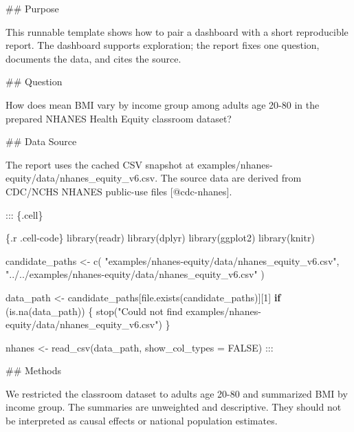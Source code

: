 \documentclass[
  letterpaper,
  DIV=11,
  numbers=noendperiod,
  oneside]{scrreprt}
\newenvironment{Shaded}{\begin{snugshade}}{\end{snugshade}}
\newcommand{\AttributeTok}[1]{\textcolor[rgb]{0.40,0.45,0.13}{#1}}
\newcommand{\CommentTok}[1]{\textcolor[rgb]{0.37,0.37,0.37}{#1}}
\newcommand{\ConstantTok}[1]{\textcolor[rgb]{0.56,0.35,0.01}{#1}}
\newcommand{\ControlFlowTok}[1]{\textcolor[rgb]{0.00,0.23,0.31}{\textbf{#1}}}
\newcommand{\DecValTok}[1]{\textcolor[rgb]{0.68,0.00,0.00}{#1}}
\newcommand{\FunctionTok}[1]{\textcolor[rgb]{0.28,0.35,0.67}{#1}}
\newcommand{\InformationTok}[1]{\textcolor[rgb]{0.37,0.37,0.37}{#1}}
\newcommand{\NormalTok}[1]{\textcolor[rgb]{0.00,0.23,0.31}{#1}}
\newcommand{\OtherTok}[1]{\textcolor[rgb]{0.00,0.23,0.31}{#1}}
\newcommand{\StringTok}[1]{\textcolor[rgb]{0.13,0.47,0.30}{#1}}
\begin{document}
\begin{Shaded}
\begin{Highlighting}[numbers=left,,]
\FunctionTok{\#\# Purpose}

\NormalTok{This runnable template shows how to pair a dashboard with a short reproducible report. The dashboard supports exploration; the report fixes one question, documents the data, and cites the source.}

\FunctionTok{\#\# Question}

\NormalTok{How does mean BMI vary by income group among adults age 20{-}80 in the prepared NHANES Health Equity classroom dataset?}

\FunctionTok{\#\# Data Source}

\NormalTok{The report uses the cached CSV snapshot at }\InformationTok{\textasciigrave{}examples/nhanes{-}equity/data/nhanes\_equity\_v6.csv\textasciigrave{}}\NormalTok{. The source data are derived from CDC/NCHS NHANES public{-}use files }\CommentTok{[}\OtherTok{@cdc{-}nhanes}\CommentTok{]}\NormalTok{.}


\NormalTok{::: \{.cell\}}

\InformationTok{\textasciigrave{}\textasciigrave{}\textasciigrave{}\{.r .cell{-}code\}}
\FunctionTok{library}\NormalTok{(readr)}
\FunctionTok{library}\NormalTok{(dplyr)}
\FunctionTok{library}\NormalTok{(ggplot2)}
\FunctionTok{library}\NormalTok{(knitr)}

\NormalTok{candidate\_paths }\OtherTok{\textless{}{-}} \FunctionTok{c}\NormalTok{(}
  \StringTok{"examples/nhanes{-}equity/data/nhanes\_equity\_v6.csv"}\NormalTok{,}
  \StringTok{"../../examples/nhanes{-}equity/data/nhanes\_equity\_v6.csv"}
\NormalTok{)}

\NormalTok{data\_path }\OtherTok{\textless{}{-}}\NormalTok{ candidate\_paths[}\FunctionTok{file.exists}\NormalTok{(candidate\_paths)][}\DecValTok{1}\NormalTok{]}
\ControlFlowTok{if}\NormalTok{ (}\FunctionTok{is.na}\NormalTok{(data\_path)) \{}
  \FunctionTok{stop}\NormalTok{(}\StringTok{"Could not find examples/nhanes{-}equity/data/nhanes\_equity\_v6.csv"}\NormalTok{)}
\NormalTok{\}}

\NormalTok{nhanes }\OtherTok{\textless{}{-}} \FunctionTok{read\_csv}\NormalTok{(data\_path, }\AttributeTok{show\_col\_types =} \ConstantTok{FALSE}\NormalTok{)}
\InformationTok{\textasciigrave{}\textasciigrave{}\textasciigrave{}}
\NormalTok{:::}


\FunctionTok{\#\# Methods}

\NormalTok{We restricted the classroom dataset to adults age 20{-}80 and summarized BMI by income group. The summaries are unweighted and descriptive. They should not be interpreted as causal effects or national population estimates.}



\end{Highlighting}
\end{Shaded}
\end{document}
